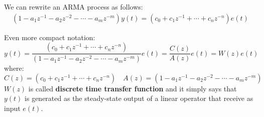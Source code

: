 We can rewrite an ARMA process as follows:
\begin{align*}
	\left(1-a_{1} z^{-1}-a_{2} z^{-2}-\cdots-a_{m} z^{-m}\right) y(t)=\left(c_{0}+c_{1} z^{-1}+\cdots+c_{n} z^{-n}\right) e(t)
\end{align*}

Even more compact notation:
\[
	\boxed{y(t)=\frac{\left(c_{0}+c_{1} z^{-1}+\cdots+c_{n} z^{-n}\right)}{\left(1-a_{1} z^{-1}-a_{2} z^{-2}-\cdots-a_{m} z^{-m}\right)} e(t)=\frac{C(z)}{A(z)} e(t)=W(z)e(t)}
\]
where:
\[
	\boxed{C(z)=\left(c_{0}+c_{1} z^{-1}+\cdots+c_{n} z^{-n}\right)} \quad \boxed{A(z)=\left(1-a_{1} z^{-1}-a_{2} z^{-2}-\cdots-a_{m} z^{-m}\right)}
\]
$W(z)$ is called \textbf{discrete time transfer function} and it simply says that $y(t)$ is generated as the steady-state output of a linear operator that receive as input $e(t)$.